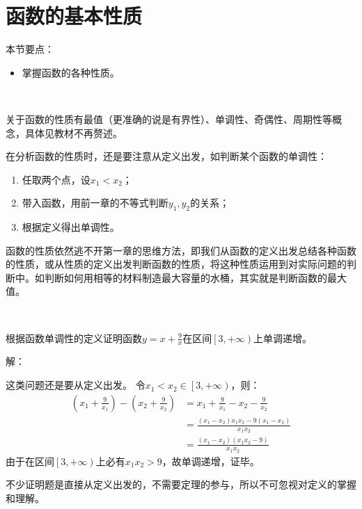 \section{函数的基本性质}

本节要点：
\begin{itemize}
    \item 掌握函数的各种性质。
\end{itemize}

~

关于函数的性质有最值（更准确的说是有界性）、单调性、奇偶性、周期性等概念，具体见教材不再赘述。

在分析函数的性质时，还是要注意从定义出发，如判断某个函数的单调性：
\begin{enumerate}
    \item 任取两个点，设$x_1<x_2$；
    \item 带入函数，用前一章的不等式判断$y_1,y_2$的关系；
    \item 根据定义得出单调性。
\end{enumerate}

\begin{tcolorbox}
函数的性质依然逃不开第一章的思维方法，即我们从函数的定义出发总结各种函数的性质，或从性质的定义出发判断函数的性质，将这种性质运用到对实际问题的判断中。如判断如何用相等的材料制造最大容量的水桶，其实就是判断函数的最大值。
\end{tcolorbox}

~

\begin{example}
根据函数单调性的定义证明函数$y=x+\frac{9}{x}$在区间$\left[ 3,+\infty \right) $上单调递增。
\end{example}

解：

这类问题还是要从定义出发。
令$x_1<x_2\in \left[ 3,+\infty \right) $，则：
\begin{align*}
\left( x_1+\frac{9}{x_1} \right) -\left( x_2+\frac{9}{x_2} \right) &=x_1+\frac{9}{x_1}-x_2-\frac{9}{x_2} \\
&=\frac{\left( x_1-x_2 \right) x_1x_2-9\left( x_1-x_2 \right)}{x_1x_2} \\
&=\frac{\left( x_1-x_2 \right) \left( x_1x_2-9 \right)}{x_1x_2}
\end{align*}
由于在区间$\left[ 3,+\infty \right) $上必有$x_1x_2>9$，故单调递增，证毕。

\begin{tcolorbox}
不少证明题是直接从定义出发的，不需要定理的参与，所以不可忽视对定义的掌握和理解。
\end{tcolorbox}





